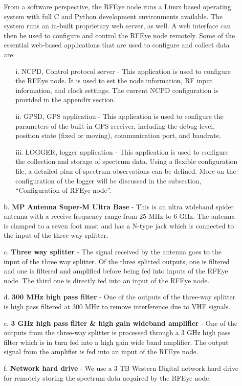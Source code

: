 \documentclass[12pt,sts]{report}
\begin{document}
\begin{enumerate}
	From a software perspective, the RFEye node runs a Linux based operating system with full C and Python development environments available. The system runs an in-built proprietary web server, as well. A web interface can then be used to configure and control the RFEye node remotely.
	Some of the essential web-based applications that are used to configure and collect data are:
	\begin{enumerate}
		\item[i.] NCPD, Control protocol server - This application is used to configure the RFEye node. It is used to set the node information, RF input information, and clock settings. The current NCPD configuration is provided in the appendix section.
		\item[ii.] GPSD, GPS application - This application is used to configure the parameters of the built-in GPS receiver, including the debug level, position state (fixed or moving), communication port, and baudrate.
		\item[iii.] LOGGER, logger application - This application is used to configure the collection and storage of spectrum data. Using a flexible configuration file, a detailed plan of spectrum observations can be defined. More on the configuration of the logger will be discussed in the subsection, ``Configuration of RFEye node''.
	\end{enumerate}
	
	\item[b.] \textbf{MP Antenna Super-M Ultra Base} - This is an ultra wideband spider antenna with a receive frequency range from 25 MHz to 6 GHz. The antenna is clamped to a seven foot mast and has a N-type jack which is connected to the input of the three-way splitter.
	\item[c.] \textbf{Three way splitter} - The signal received by the antenna goes to the input of the three way splitter. Of the three splitted outputs, one is filtered and one is filtered and amplified before being fed into inputs of the RFEye node. The third one is directly fed into an input of the RFEye node. 
	\item[d.] \textbf{300 MHz high pass filter} - One of the outputs of the three-way splitter is high pass filtered at 300 MHz to remove interference due to VHF signals.
	\item[e.] \textbf{3 GHz high pass filter \& high gain wideband amplifier} - One of the outputs from the three-way splitter is processed through a 3 GHz high pass filter which is in turn fed into a high gain wide band amplifier. The output signal from the amplifier is fed into an input of the RFEye node.
	\item[f.] \textbf{Network hard drive} - We use a 3 TB Western Digital network hard drive for remotely storing the spectrum data acquired by the RFEye node.
\end{enumerate}
\end{document}
